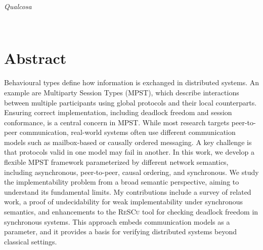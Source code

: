 \documentclass[12pt,a4paper,twoside]{book}
\theoremstyle{definition}
\theoremstyle{definition}
\theoremstyle{definition}
\begin{document}

\thispagestyle{plain}
\restoregeometry
\topmargin=6.5cm
\begin{flushright}
\emph{
\LARGE{Qualcosa}%
}
\end{flushright}

\newpage~\thispagestyle{plain}~\newpage

{}
\chapter*{Abstract}
Behavioural types define how information is exchanged in distributed systems.
An example are Multiparty Session Types (MPST), which describe interactions between multiple participants
using global protocols and their local counterparts. Ensuring correct implementation,
including deadlock freedom and session conformance, is a central concern in MPST.
While most research targets peer-to-peer communication, real-world systems often
use different communication models such as mailbox-based or causally ordered messaging.
A key challenge is that protocols valid in one model may fail in another.
In this work, we develop a flexible MPST framework parameterized by different network
semantics, including asynchronous, peer-to-peer, causal ordering, and synchronous.
We study the implementability problem from a broad semantic perspective, aiming to
understand its fundamental limits. My contributions include a survey
of related work, a proof of undecidability for weak implementability under synchronous
semantics, and enhancements to the \textsc{ReSCu} tool for checking deadlock freedom in
synchronous systems. This approach embeds communication models as a parameter, and it
provides a basis for verifying distributed systems beyond classical settings.

\thispagestyle{plain}
\topmargin=-1cm
\cleardoublepage
{}
{}
\tableofcontents
\thispagestyle{empty}
\cleardoublepage
{}
{}
\listoftables
\thispagestyle{empty}
\cleardoublepage
{}
{}
\listoffigures
\thispagestyle{empty}
\cleardoublepage
{}
{}
\lstlistoflistings
\thispagestyle{empty}
\newpage~\newpage
\end{document}
